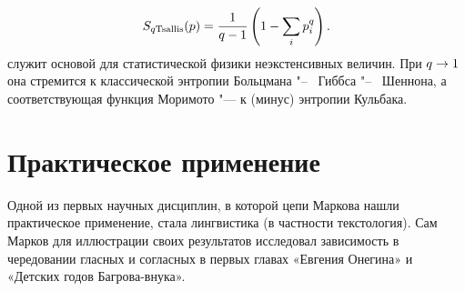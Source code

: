 \documentclass{article}
\begin{document}
\begin{itemize}
	\begin{equation*}
		S_{{q{{\rm {Tsallis}}}}}(p)={1 \over q-1}\left(1-\sum _{i}p_{i}^{q}\right).
	\end{equation*}
	служит основой для статистической физики неэкстенсивных величин. При ${\displaystyle q\to 1}$ она стремится к классической энтропии Больцмана "--~ Гиббса "--~ Шеннона, а соответствующая функция Моримото "--- к (минус) энтропии Кульбака.
\end{itemize}

\section{Практическое применение}
Одной из первых научных дисциплин, в которой цепи Маркова нашли практическое применение, стала лингвистика (в частности текстология). Сам Марков для иллюстрации своих результатов исследовал зависимость в чередовании гласных и согласных в первых главах «Евгения Онегина» и «Детских годов Багрова-внука».


\nocite{*}

\end{document}
